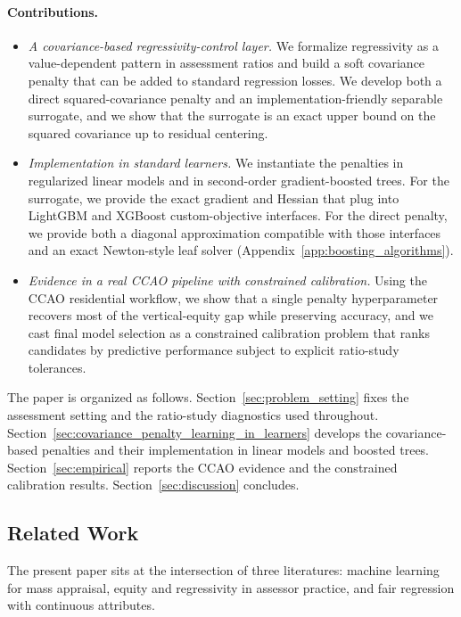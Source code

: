 \documentclass[12pt]{article}
\theoremstyle{plain}
\theoremstyle{definition}
\newcommand{\1}{\mathbf{1}}
\begin{document}
\paragraph{Contributions.}
\begin{itemize}
    \item \textit{A covariance-based regressivity-control layer.} We formalize regressivity as a value-dependent pattern in assessment ratios and build a soft covariance penalty that can be added to standard regression losses. We develop both a direct squared-covariance penalty and an implementation-friendly separable surrogate, and we show that the surrogate is an exact upper bound on the squared covariance up to residual centering.
    \item \textit{Implementation in standard learners.} We instantiate the penalties in regularized linear models and in second-order gradient-boosted trees. For the surrogate, we provide the exact gradient and Hessian that plug into LightGBM and XGBoost custom-objective interfaces. For the direct penalty, we provide both a diagonal approximation compatible with those interfaces and an exact Newton-style leaf solver (Appendix~\ref{app:boosting_algorithms}).
    \item \textit{Evidence in a real CCAO pipeline with constrained calibration.} Using the CCAO residential workflow, we show that a single penalty hyperparameter recovers most of the vertical-equity gap while preserving accuracy, and we cast final model selection as a constrained calibration problem that ranks candidates by predictive performance subject to explicit ratio-study tolerances.
\end{itemize}

The paper is organized as follows. Section~\ref{sec:problem_setting} fixes the assessment setting and the ratio-study diagnostics used throughout. Section~\ref{sec:covariance_penalty_learning_in_learners} develops the covariance-based penalties and their implementation in linear models and boosted trees. Section~\ref{sec:empirical} reports the CCAO evidence and the constrained calibration results. Section~\ref{sec:discussion} concludes.

\subsection{Related Work}

The present paper sits at the intersection of three literatures: machine learning for mass appraisal, equity and regressivity in assessor practice, and fair regression with continuous attributes.
\end{document}
